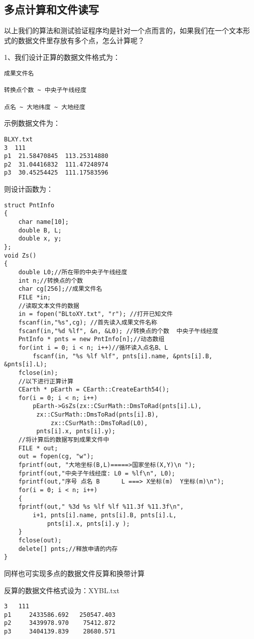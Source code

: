 \subsection{多点计算和文件读写}
以上我们的算法和测试验证程序均是针对一个点而言的，如果我们在一个文本形
式的数据文件里存放有多个点，怎么计算呢？

1、我们设计正算的数据文件格式为：
\begin{verbatim}
成果文件名

转换点个数 ~ 中央子午线经度

点名 ~ 大地纬度 ~ 大地经度
\end{verbatim}

示例数据文件为：

\begin{verbatim}
BLXY.txt
3  111
p1  21.58470845  113.25314880
p2  31.04416832  111.47248974
p3  30.45254425  111.17583596
\end{verbatim}

则设计函数为：
\begin{verbatim}
struct PntInfo
{
    char name[10];
    double B, L;
    double x, y;
};
void Zs()
{
    double L0;//所在带的中央子午线经度
    int n;//转换点的个数
    char cg[256];//成果文件名
    FILE *in;
    //读取文本文件的数据
    in = fopen("BLtoXY.txt", "r"); //打开已知文件
    fscanf(in,"%s",cg); //首先读入成果文件名称
    fscanf(in,"%d %lf", &n, &L0); //转换点的个数  中央子午线经度
    PntInfo * pnts = new PntInfo[n];//动态数组
    for(int i = 0; i < n; i++)//循环读入点名B、L
        fscanf(in, "%s %lf %lf", pnts[i].name, &pnts[i].B, &pnts[i].L);
    fclose(in);
    //以下进行正算计算
    CEarth * pEarth = CEarth::CreateEarth54();
    for(i = 0; i < n; i++)
        pEarth->GsZs(zx::CSurMath::DmsToRad(pnts[i].L),
         zx::CSurMath::DmsToRad(pnts[i].B),
             zx::CSurMath::DmsToRad(L0),
         pnts[i].x, pnts[i].y);
    //将计算后的数据写到成果文件中
    FILE * out;
    out = fopen(cg, "w");
    fprintf(out, "大地坐标(B,L)=====>国家坐标(X,Y)\n ");
    fprintf(out,"中央子午线经度: L0 = %lf\n", L0);
    fprintf(out,"序号 点名 B      L ===> X坐标(m)  Y坐标(m)\n");
    for(i = 0; i < n; i++)
    {
    fprintf(out," %3d %s %lf %lf %11.3f %11.3f\n",
        i+1, pnts[i].name, pnts[i].B, pnts[i].L,
            pnts[i].x, pnts[i].y );
    }
    fclose(out);
    delete[] pnts;//释放申请的内存
}
\end{verbatim}

同样也可实现多点的数据文件反算和换带计算

反算的数据文件格式设为：XYBL.txt
\begin{verbatim}
3   111
p1     2433586.692   250547.403
p2     3439978.970    75412.872
p3     3404139.839    28680.571
\end{verbatim}

